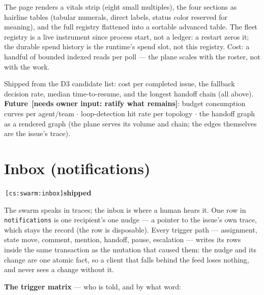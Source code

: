 \documentclass[11pt,a4paper]{report}
\newcommand{\cs}[1]{\,\texttt{\scriptsize[cs:#1]}\label{cs:#1}}
\newcommand{\shipped}{\textbf{\textcolor{green!45!black}{shipped}}}
\newcommand{\owner}[1]{\,\textcolor{red!60!black}{\textbf{[needs owner input: #1]}}}
\begin{document}
The page renders a vitals strip (eight small multiples), the four
sections as hairline tables (tabular numerals, direct labels, status
color reserved for meaning), and the full registry flattened into a
sortable advanced table. The fleet registry is a live instrument since
process start, not a ledger: a restart zeros it; the durable spend
history is the runtime's spend slot, not this registry. Cost: a handful
of bounded indexed reads per poll --- the plane scales with the roster,
not with the work.

Shipped from the D3 candidate list: cost per completed issue,
the fallback decision rate, median time-to-resume, and the longest
handoff chain (all above). \textbf{Future} \owner{ratify what remains}:
budget consumption curves per agent/team $\cdot$
loop-detection hit rate per topology $\cdot$ the handoff graph as a
rendered graph (the plane serves its volume and chain; the edges
themselves are the issue's trace).

\section{Inbox (notifications)}
\label{sec:inbox}
\cs{swarm:inbox}\shipped\

The swarm speaks in traces; the inbox is where a human hears it. One
row in \texttt{notifications} is one recipient's one nudge --- a pointer
to the issue's own trace, which stays the record (the row is
disposable). Every trigger path --- assignment, state move, comment,
mention, handoff, pause, escalation --- writes its rows inside the same
transaction as the mutation that caused them: the nudge and its change
are one atomic fact, so a client that falls behind the feed loses
nothing, and never sees a change without it.

\textbf{The trigger matrix} --- who is told, and by what word:
\end{document}
